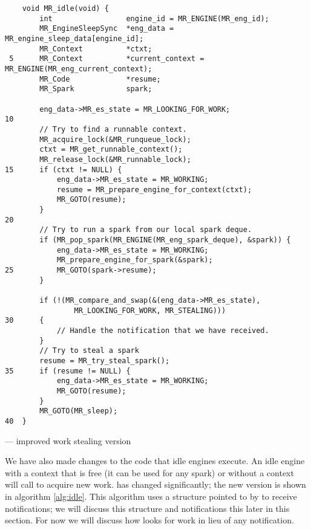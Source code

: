 \begin{algorithm}[tbp]
\begin{verbatim}
    void MR_idle(void) {
        int                 engine_id = MR_ENGINE(MR_eng_id);
        MR_EngineSleepSync  *eng_data = MR_engine_sleep_data[engine_id];
        MR_Context          *ctxt;
 5      MR_Context          *current_context = MR_ENGINE(MR_eng_current_context);
        MR_Code             *resume;
        MR_Spark            spark;

        eng_data->MR_es_state = MR_LOOKING_FOR_WORK;
10
        // Try to find a runnable context.
        MR_acquire_lock(&MR_runqueue_lock);
        ctxt = MR_get_runnable_context();
        MR_release_lock(&MR_runnable_lock);
15      if (ctxt != NULL) {
            eng_data->MR_es_state = MR_WORKING;
            resume = MR_prepare_engine_for_context(ctxt);
            MR_GOTO(resume);
        }
20     
        // Try to run a spark from our local spark deque.
        if (MR_pop_spark(MR_ENGINE(MR_eng_spark_deque), &spark)) {
            eng_data->MR_es_state = MR_WORKING;
            MR_prepare_engine_for_spark(&spark);
25          MR_GOTO(spark->resume);
        }

        if (!(MR_compare_and_swap(&(eng_data->MR_es_state),
                MR_LOOKING_FOR_WORK, MR_STEALING)))
30      {
            // Handle the notification that we have received.
        }
        // Try to steal a spark
        resume = MR_try_steal_spark();
35      if (resume != NULL) {
            eng_data->MR_es_state = MR_WORKING;
            MR_GOTO(resume);
        }
        MR_GOTO(MR_sleep);
40  }
\end{verbatim}
\caption{\idle --- improved work stealing version}
\label{alg:idle}
\end{algorithm}

We have also made changes to the code that idle engines execute.
An idle engine with a context that is free (it can be used for any spark) or
without a context will call \idle to acquire new work.
\idle has changed significantly;
the new version is shown in algorithm \ref{alg:idle}.
This algorithm uses a structure pointed to by  to receive
notifications;
we will discuss this structure and notifications this later in this section.
For now we will discuss how \idle looks for work in lieu of any notification.


